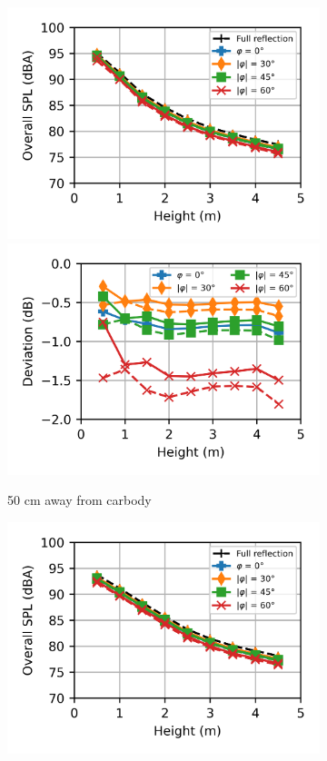 \begin{figure}[H]\ContinuedFloat
	\begin{subfigure}[b]{\textwidth}
		\centering
		\includegraphics{fig/chap5/impedance/overall_SPL/overall_SPL_pos_f.png}
		\includegraphics{fig/chap5/impedance/overall_SPL/deviation_pos_f.png}
		\caption{50 cm away from carbody}
	\end{subfigure}
	\begin{subfigure}[b]{\textwidth}
		\centering
		\includegraphics{fig/chap5/impedance/overall_SPL/overall_SPL_pos_g.png}

\end{subfigure}
\end{figure}
